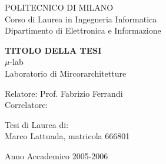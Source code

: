 \thispagestyle{empty}
\vspace*{-1.5cm} \bfseries{
\begin{center}
  \large
  POLITECNICO DI MILANO\\
  \normalsize
  Corso di Laurea in Ingegneria Informatica\\
  Dipartimento di Elettronica e Informazione\\
  \begin{figure}[htbp]
    \begin{center}
    \end{center}
  \end{figure}
  \vspace*{0.3cm} \LARGE



  \textbf{TITOLO DELLA TESI}\\



  \vspace*{.75truecm} \large
  $\mu$-lab \\
  Laboratorio di Mircorarchitetture
\end{center}
\vspace*{3.0cm} \large
\begin{flushleft}


  Relatore: Prof. Fabrizio Ferrandi \\
  Correlatore: 

\end{flushleft}
\vspace*{1.0cm}
\begin{flushright}


  Tesi di Laurea di:\\ Marco Lattuada, matricola 666801 \\ 


\end{flushright}
\vspace*{0.5cm}
\begin{center}



  Anno Accademico 2005-2006
\end{center} \clearpage
}
